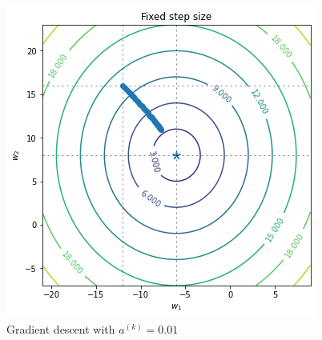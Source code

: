 \documentclass[10pt]{article}
\begin{document}
\begin{enumerate}[1)]
\begin{figure}[H]
  \includegraphics[scale=0.6]{p43c.png}
  \caption{Gradient descent with $a^{(k)}=0.01$}
\end{figure}

\end{enumerate}
\end{document}
